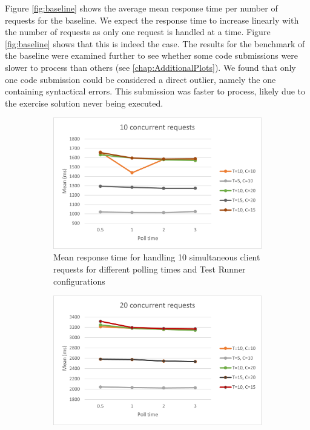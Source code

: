 Figure \ref{fig:baseline} shows the average mean response time per number of requests for the baseline.
We expect the response time to increase linearly with the number of requests as only one request is handled at a time.
Figure \ref{fig:baseline} shows that this is indeed the case.
The results for the benchmark of the baseline were examined further to see whether some code submissions were slower to process than others (see \ref{chap:AdditionalPlots}).
We found that only one code submission could be considered a direct outlier, namely the one containing syntactical errors.
This submission was faster to process, likely due to the exercise solution never being executed.



\begin{figure}
  \centering
  \begin{subfigure}[b]{0.45\textwidth}
      \centering
      \includegraphics[width=\textwidth]{images/10.png}
      \caption{Mean response time for handling 10 simultaneous client requests for different polling times and Test Runner configurations}
      \label{fig:resultstart}
  \end{subfigure}
  \hfill
  \begin{subfigure}[b]{0.45\textwidth}
    \centering
    \includegraphics[width=\textwidth]{images/20.png}

\end{subfigure}
\end{figure}
